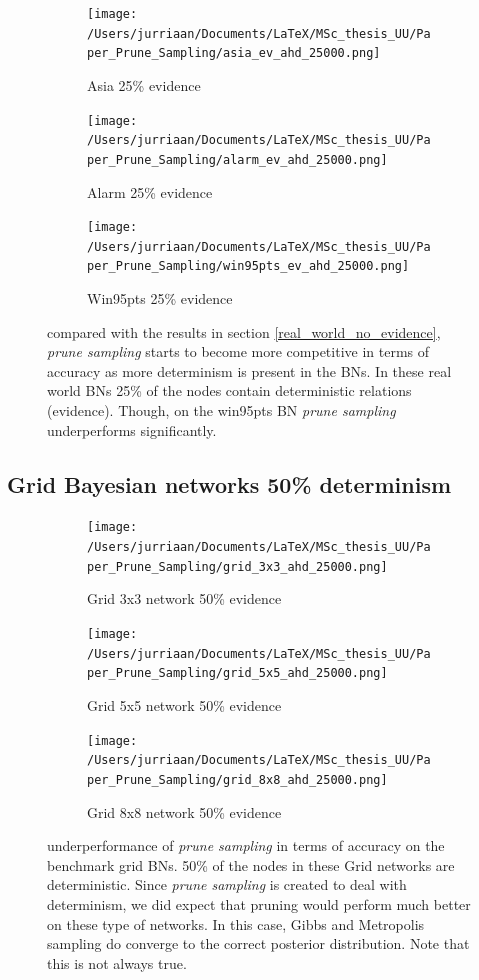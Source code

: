 \documentclass[a4paper, twoside, 11pt]{report}
\theoremstyle{plain}
\theoremstyle{definition}
\theoremstyle{remark}
\newcommand{\ps}{\textit{prune sampling }}
\begin{document}
\begin{figure}[H]
\centering
\begin{subfigure}{0.5\textwidth}
\texttt{[image: /Users/jurriaan/Documents/LaTeX/MSc\_thesis\_UU/Paper\_Prune\_Sampling/asia\_ev\_ahd\_25000.png]}
\caption{Asia 25\% evidence}%
\label{asia}%
\end{subfigure}\hfill%
\begin{subfigure}{0.5\textwidth}
\texttt{[image: /Users/jurriaan/Documents/LaTeX/MSc\_thesis\_UU/Paper\_Prune\_Sampling/alarm\_ev\_ahd\_25000.png]}
\caption{Alarm 25\% evidence}%
\label{alarm}%
\end{subfigure}%
\begin{subfigure}{0.5\textwidth}
\texttt{[image: /Users/jurriaan/Documents/LaTeX/MSc\_thesis\_UU/Paper\_Prune\_Sampling/win95pts\_ev\_ahd\_25000.png]}
\caption{Win95pts 25\% evidence}%
\label{win95pts}%
\end{subfigure}\hfill%
\vspace{0.75pc}
\caption{compared with the results in section \ref{real_world_no_evidence}, \ps starts to become more competitive in terms of accuracy as more determinism is present in the BNs. In these real world BNs 25\% of the nodes contain deterministic relations (evidence). Though, on the win95pts BN \ps underperforms significantly.}
\label{results2}
\end{figure}

\newpage
\subsection{Grid Bayesian networks 50\% determinism}
\begin{figure}[H]
\centering
\begin{subfigure}{0.49\textwidth}
\texttt{[image: /Users/jurriaan/Documents/LaTeX/MSc\_thesis\_UU/Paper\_Prune\_Sampling/grid\_3x3\_ahd\_25000.png]}
\caption{Grid 3x3 network 50\% evidence}%
\label{grid_3x3}%
\end{subfigure}\hfill%
\begin{subfigure}{0.49\textwidth}
\texttt{[image: /Users/jurriaan/Documents/LaTeX/MSc\_thesis\_UU/Paper\_Prune\_Sampling/grid\_5x5\_ahd\_25000.png]}
\caption{Grid 5x5 network 50\% evidence}%
\label{grid_5x5}%
\end{subfigure}
\begin{subfigure}{0.49\textwidth}
\texttt{[image: /Users/jurriaan/Documents/LaTeX/MSc\_thesis\_UU/Paper\_Prune\_Sampling/grid\_8x8\_ahd\_25000.png]}
\caption{Grid 8x8 network 50\% evidence}%
\label{grid_8x8}%
\end{subfigure}\hfill%
\caption{underperformance of \ps in terms of accuracy on the benchmark grid BNs. 50\% of the nodes in these Grid networks are deterministic. Since \ps is created to deal with determinism, we did expect that pruning would perform much better on these type of networks. In this case, Gibbs and Metropolis sampling do converge to the correct posterior distribution. Note that this is not always true.}
\label{results1}
\end{figure}
\end{document}
